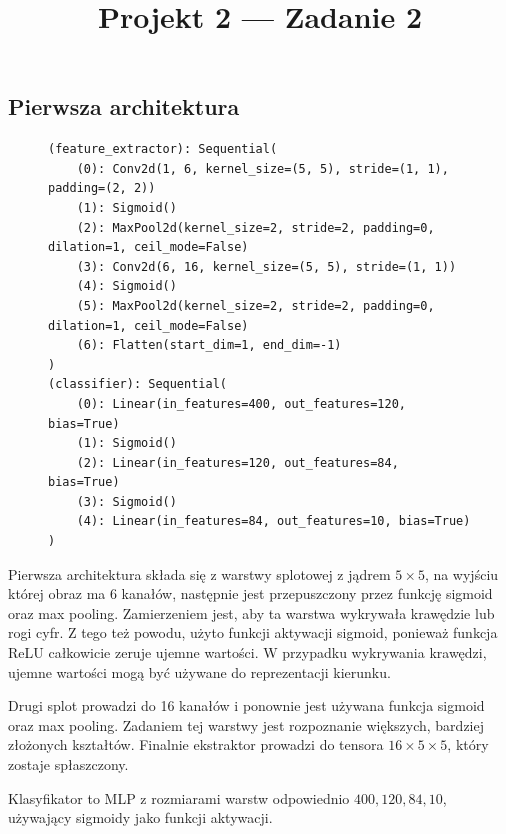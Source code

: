\documentclass[10pt]{article}
\title{Projekt 2 --- Zadanie 2}
\begin{document}
\subsection*{Pierwsza architektura}

\begin{figure}
    \tiny
\begin{verbatim}
(feature_extractor): Sequential(
    (0): Conv2d(1, 6, kernel_size=(5, 5), stride=(1, 1), padding=(2, 2))
    (1): Sigmoid()
    (2): MaxPool2d(kernel_size=2, stride=2, padding=0, dilation=1, ceil_mode=False)
    (3): Conv2d(6, 16, kernel_size=(5, 5), stride=(1, 1))
    (4): Sigmoid()
    (5): MaxPool2d(kernel_size=2, stride=2, padding=0, dilation=1, ceil_mode=False)
    (6): Flatten(start_dim=1, end_dim=-1)
)
(classifier): Sequential(
    (0): Linear(in_features=400, out_features=120, bias=True)
    (1): Sigmoid()
    (2): Linear(in_features=120, out_features=84, bias=True)
    (3): Sigmoid()
    (4): Linear(in_features=84, out_features=10, bias=True)
)
\end{verbatim}
\end{figure}

Pierwsza architektura składa się z warstwy splotowej z jądrem $5\times5$, na wyjściu której obraz ma 6 kanałów, następnie jest przepuszczony przez funkcję sigmoid oraz max pooling.
Zamierzeniem jest, aby ta warstwa wykrywała krawędzie lub rogi cyfr.
Z tego też powodu, użyto funkcji aktywacji sigmoid, ponieważ funkcja ReLU całkowicie zeruje ujemne wartości.
W przypadku wykrywania krawędzi, ujemne wartości mogą być używane do reprezentacji kierunku.

Drugi splot prowadzi do 16 kanałów i ponownie jest używana funkcja sigmoid oraz max pooling.
Zadaniem tej warstwy jest rozpoznanie większych, bardziej złożonych kształtów.
Finalnie ekstraktor prowadzi do tensora $16 \times 5 \times 5$, który zostaje spłaszczony.

Klasyfikator to MLP z rozmiarami warstw odpowiednio $400,120,84,10$, używający sigmoidy jako funkcji aktywacji.

\kubaMnistLarge{}
\end{document}
